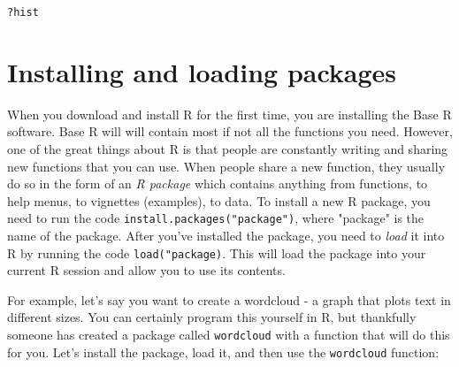 \documentclass{tufte-book}\usepackage[]{graphicx}\usepackage[]{color}
\makeatletter
\newcommand{\hlopt}[1]{\textcolor[rgb]{0,0,0}{#1}}%
\newcommand{\hlstd}[1]{\textcolor[rgb]{0.345,0.345,0.345}{#1}}%
\newenvironment{kframe}{%
 \def\at@end@of@kframe{}%
 \ifinner\ifhmode%
  \def\at@end@of@kframe{\end{minipage}}%
  \begin{minipage}{\columnwidth}%
 \fi\fi%
 \def\FrameCommand##1{\hskip\@totalleftmargin \hskip-\fboxsep
 \colorbox{shadecolor}{##1}\hskip-\fboxsep
     \hskip-\linewidth \hskip-\@totalleftmargin \hskip\columnwidth}%
 \MakeFramed {\advance\hsize-\width
   \@totalleftmargin\z@ \linewidth\hsize
   \@setminipage}}%
 {\par\unskip\endMakeFramed%
 \at@end@of@kframe}
\newenvironment{knitrout}{}{} %
\makeatother
\begin{document}

\begin{footnotesize}
\begin{knitrout}
\color{fgcolor}\begin{kframe}
\begin{alltt}
\hlopt{?}\hlstd{hist}
\end{alltt}
\end{kframe}
\end{knitrout}
\end{footnotesize}


\section{Installing and loading packages}

When you download and install R for the first time, you are installing the Base R software. Base R will will contain most if not all the functions you need. However, one of the great things about R is that people are constantly writing and sharing new functions that you can use. When people share a new function, they usually do so in the form of an \textit{R package} which contains anything from functions, to help menus, to vignettes (examples), to data. To install a new R package, you need to run the code \texttt{install.packages("package")}, where "package" is the name of the package. After you've installed the package, you need to \textit{load} it into R by running the code \texttt{load("package)}. This will load the package into your current R session and allow you to use its contents.

For example, let's say you want to create a wordcloud - a graph that plots text in different sizes. You can certainly program this yourself in R, but thankfully someone has created a package called \texttt{wordcloud} with a function that will do this for you. Let's install the package, load it, and then use the \texttt{wordcloud} function:
\end{document}
